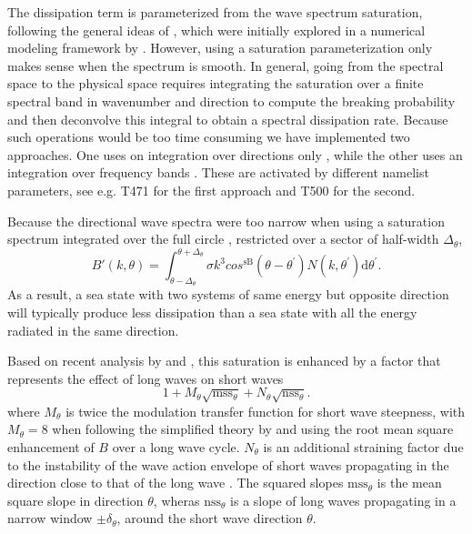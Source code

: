 The dissipation term is parameterized from the wave spectrum saturation, following the general ideas of \cite{art:Phi85}, 
which were initially explored in a numerical modeling framework by \cite{art:AB03}. However, using a saturation parameterization 
only makes sense when the spectrum is smooth. In general, going from the spectral space to the physical space requires 
integrating the saturation over a finite spectral band in wavenumber and direction to compute the breaking probability 
and then deconvolve this integral to obtain a spectral dissipation rate. Because such operations would be too time consuming we have 
implemented two approaches. One uses on integration over directions only \citep{art:Aea10}, while the other uses an integration  over frequency 
bands \citep{Filipot&Ardhuin2012}. These are activated by different namelist parameters, see e.g. T471 for the first approach and T500 for the second.

Because the directional wave spectra were too narrow when using a
saturation spectrum integrated over the full circle \citep{art:AL06},
\citep{art:Aea10} restricted over a sector of half-width $\Delta_\theta$,
\begin{equation}
B'\left(k,\theta\right)=
\int_{\theta-\Delta_\theta}^{\theta+\Delta_\theta} \sigma k^3 cos^{\mathrm{sB}}\left(\theta-
\theta^{\prime}\right) N(k,\theta^{\prime}) \mathrm d
\theta^{\prime} \label{defBofkprime}.
\end{equation}
As a result, a sea state with two systems of same energy but opposite
direction will typically produce less dissipation than a sea state with all
the energy radiated in the same direction.

Based on recent analysis by \cite{Guimaraes2018} and \cite{Peureux&al.2019}, this saturation is enhanced by a factor that represents 
the effect of long waves on short waves 
\begin{equation}
1+M_\theta \sqrt{\mathrm{mss}_\theta} + N_\theta \sqrt{\mathrm{nss}_\theta} \label{defFACSAT}.
\end{equation}
where $M_\theta$ is twice the modulation transfer function for short wave steepness, with 
$M_\theta=8$ when following the simplified theory by \cite{art:LHS60} and using the root mean square enhancement of $B$ over a 
long wave cycle. $N_\theta$ is an additional straining factor due to the instability of the wave action envelope of short waves 
propagating in the direction close to that of the long wave \citep{Peureux&al.2019}. The squared slopes $\mathrm{mss}_\theta$ is 
the mean square slope in direction $\theta$, wheras $\mathrm{nss}_\theta$ is a slope of long waves propagating in a narrow window $\pm \delta_\theta$, 
around the short wave direction $\theta$.

